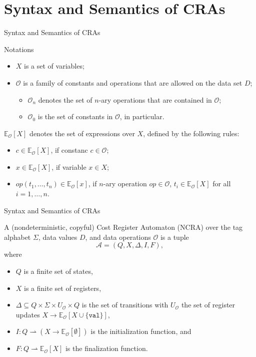 \documentclass[landscape]{beamer}
\newcommand{\calO}{\mathcal{O}}
\newcommand{\calA}{\mathcal{A}}
\newcommand{\bbE}{\mathbb{E}}
\newcommand{\ttVal}{\mathtt{val}}
\begin{document}
\section{Syntax and Semantics of CRAs}
\begin{frame}{Syntax and Semantics of CRAs}
    \begin{block}{Notations}
    \begin{itemize}
        \item $X$ is a set of variables;
        \item $\calO$ is a family of constants and operations
            that are allowed on the data set $D$;
        \begin{itemize}
            \item $\calO_n$ denotes the set of $n$-ary operations
                that are contained in $\calO$;
            \item $\calO_0$ is the set of constants in $\calO$, in particular.
        \end{itemize}
    \end{itemize}
    \end{block}
    \pause
    \begin{definition}
    $\bbE_\calO[X]$ denotes the set of \alert{expressions} over $X$,
    defined by the following rules:
    \begin{itemize}
        \item $c \in \bbE_\calO[X]$, if constanc $c \in \calO$;
        \item $x \in \bbE_\calO[X]$, if variable $x \in X$;
        \item $op(t_1, \dots, t_n) \in \bbE_\calO[x]$,
            if $n$-ary operation $op \in \calO$,
            $t_i \in \bbE_\calO[X]$ for all $i = 1, \dots, n$.
    \end{itemize}
    \end{definition}
\end{frame}
\begin{frame}{Syntax and Semantics of CRAs}
    \begin{definition}[CRA]
    A (nondeterministic, copyful) \alert{Cost Register Automaton (NCRA)}
    over the tag alphabet $\Sigma$, data values $D$,
    and data operations $\calO$ is a tuple
    \[
        \calA = (Q, X, \Delta, I, F),
    \]
    where
    \begin{itemize}
        \item $Q$ is a finite set of states,
        \item $X$ is a finite set of registers,
        \item $\Delta \subseteq Q \times \Sigma \times U_\calO \times Q$ is the set of 
            transitions with $U_\calO$ the set of register updates
            $X \to \bbE_\calO[X \cup \{ \ttVal \}]$,
        \item $I: Q \rightharpoonup (X \to \bbE_\calO[\emptyset])$ is the initialization function, and
        \item $F: Q \rightharpoonup \bbE_\calO[X]$ is the finalization function.
    \end{itemize}
    \end{definition}
\end{frame}
\end{document}
